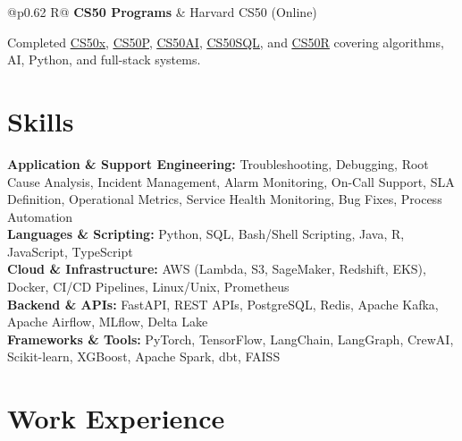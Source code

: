 \documentclass[a4paper,10pt]{article}
\newcommand{\ulink}[2]{\href{#1}{\uline{#2}}}
\newcommand{\subheading}[1]{{\color[HTML]{0A0A0A}\fontsize{12}{14}\selectfont\bfseries #1}}
\newcommand{\meta}[1]{{\color[HTML]{5C5C5C}\fontsize{10.5}{12.5}\selectfont #1}}
\begin{document}
\begin{tabularx}{\linewidth}{@{}p{0.62\linewidth} R@{}}
\subheading{CS50 Programs} & \meta{Harvard CS50 (Online)}
\end{tabularx}
\vspace{1pt}
{\color[HTML]{3A3A3A}\fontsize{11}{14}\selectfont Completed \ulink{https://cs50.harvard.edu/certificates/b14b78df-e05c-413e-a607-1dd27303053a}{CS50x}, \ulink{https://cs50.harvard.edu/certificates/32477052-9db4-49c4-a5a4-d7e58429ca2c}{CS50P}, \ulink{https://cs50.harvard.edu/certificates/9cdb4d4a-1250-4f8e-9fd7-191864e0f919}{CS50AI}, \ulink{https://cs50.harvard.edu/certificates/bc486f24-f085-4e61-8536-80940b97a1b9}{CS50SQL}, and \ulink{https://cs50.harvard.edu/certificates/666838e6-a053-4d82-b179-a60fe745fd84}{CS50R} covering algorithms, AI, Python, and full-stack systems.}

\vspace{2pt}

\section{Skills}
\vspace{5pt}
{\color[HTML]{0A0A0A}\fontsize{11}{14}\selectfont
\textbf{Application \& Support Engineering:} Troubleshooting, Debugging, Root Cause Analysis, Incident Management, Alarm Monitoring, On-Call Support, SLA Definition, Operational Metrics, Service Health Monitoring, Bug Fixes, Process Automation \\[2pt]
\textbf{Languages \& Scripting:} Python, SQL, Bash/Shell Scripting, Java, R, JavaScript, TypeScript \\[2pt]
\textbf{Cloud \& Infrastructure:} AWS (Lambda, S3, SageMaker, Redshift, EKS), Docker, CI/CD Pipelines, Linux/Unix, Prometheus \\[2pt]
\textbf{Backend \& APIs:} FastAPI, REST APIs, PostgreSQL, Redis, Apache Kafka, Apache Airflow, MLflow, Delta Lake \\[2pt]
\textbf{Frameworks \& Tools:} PyTorch, TensorFlow, LangChain, LangGraph, CrewAI, Scikit-learn, XGBoost, Apache Spark, dbt, FAISS}

\vspace{2pt}

\section{Work Experience}
\vspace{2pt}
\end{document}
